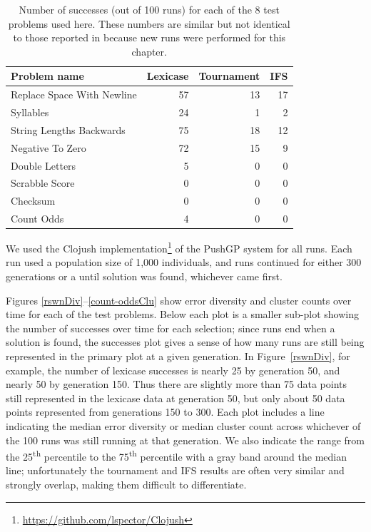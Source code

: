 \begin{table}
\centering
	\caption{Number of successes (out of 100 runs) for each of the 8 test problems used here. These numbers are similar but not identical to those reported in 
		\citep{Helmuth:2015:GECCO} because new runs were performed for this chapter.}
	\label{tab:successCounts}
	\begin{tabular}{lrrr}
		\hline
		Problem name \quad & Lexicase \quad & Tournament \quad & IFS \\
		\hline
		Replace Space With Newline & 57 & 13 & 17 \\ %
		Syllables & 24 & 1 & 2 \\ %
		String Lengths Backwards & 75 & 18 & 12 \\
		Negative To Zero & 72 & 15 & 9 \\
		Double Letters & 5 & 0 & 0 \\
		Scrabble Score & 0 & 0 & 0 \\
		Checksum & 0 & 0 & 0 \\
		Count Odds & 4 & 0 & 0 \\
		\hline
	\end{tabular}
\end{table}

We used the Clojush implementation\footnote{\url{https://github.com/lspector/Clojush}} 
of the PushGP system \citep{spector:2002:GPEMnoURL, 1068292noURL} for all runs. Each run used a population size of 1,000 
individuals, and runs continued for either 300 generations or a until solution was found, whichever 
came first. 

Figures \ref{rswnDiv}--\ref{count-oddsClu} show error diversity and cluster counts over time for each of
the test problems. Below each plot is a smaller sub-plot showing the number of successes 
over time for each selection; since runs end when a solution is found, the successes plot gives a
sense of how many runs are still being represented in the primary plot at a given generation.
In Figure~\ref{rswnDiv}, for example, the number of lexicase successes is nearly 25 by generation
50, and nearly 50 by generation 150. Thus there are slightly more than 75 data points still represented
in the lexicase data at generation 50, but only about 50 data points represented from generations 150
to 300. Each plot includes a line indicating the median error diversity or median cluster count across
whichever of the 100 runs was still running at that generation. We also indicate the 
range from the 25\textsuperscript{th} percentile to the 75\textsuperscript{th} percentile with a gray band around the median line; 
unfortunately the tournament and IFS results are often very similar and strongly overlap, making them difficult to differentiate.

